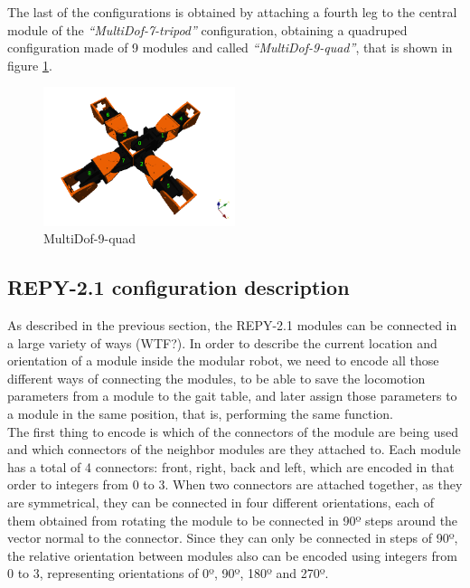 The last of the configurations is obtained by attaching a fourth leg to the central module of the \emph{``MultiDof-7-tripod''} configuration, obtaining a quadruped configuration made of 9 modules and called \emph{``MultiDof-9-quad''}, that is shown in figure \ref{fig:config_repy2_multidof-9-quad}.\\

\begin{figure}[h]
		\centering
        \includegraphics[width=0.5\textwidth]{images/Conf_repy2_multidof-9-quad.png}
        \caption{MultiDof-9-quad}
        \label{fig:config_repy2_multidof-9-quad}
\end{figure}



\subsection{REPY-2.1 configuration description}
\label{config_repy_description}
As described in the previous section, the REPY-2.1 modules can be connected in a large variety of ways {\color{red} (WTF?)}. In order to describe the current location and orientation of a module inside the modular robot, we need to encode all those different ways of connecting the modules, to be able to save the locomotion parameters from a module to the gait table, and later assign those parameters to a module in the same position, that is, performing the same function.\\

The first thing to encode is which of the connectors of the module are being used and which connectors of the neighbor modules are they attached to. Each module has a total of 4 connectors: front, right, back and left, which are encoded in that order to integers from 0 to 3. When two connectors are attached together, as they are symmetrical, they can be connected in four different orientations, each of them obtained from rotating the module to be connected in 90º steps around the vector normal to the connector. Since they can only be connected in steps of 90º, the relative orientation between modules also can be encoded using integers from 0 to 3, representing orientations of 0º, 90º, 180º and 270º.\\

